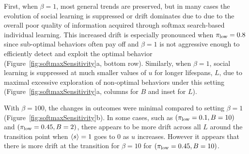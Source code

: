 \documentclass[letterpaper,11.5pt]{scrartcl}
\begin{document}
First, when $\beta=1$, most general trends are preserved, but in many cases the evolution
of social learning is suppressed or drift dominates due to 
due to the overall poor quality of information acquired through softmax search-based
individual learning. This increased drift is especially pronounced 
when $\pi_{\mathrm{low}}=0.8$ since sub-optimal behaviors often pay off and $\beta=1$ is
not aggressive enough to efficiently detect and exploit the optimal 
behavior (Figure~\ref{fig:softmaxSensitivity}a, bottom row).
Similarly, when $\beta = 1$, social learning is suppressed at much smaller values
of $u$ for longer lifespans, $L$, due to maximal excessive exploration of non-optimal
behaviors under this setting (Figure~\ref{fig:softmaxSensitivity}a, columns 
for $B$ and inset for $L$).

With $\beta=100$, the changes in outcomes were minimal compared
to setting $\beta=1$ (Figure~\ref{fig:softmaxSensitivity}b). 
In some cases, such as $(\pi_{\mathrm{low}}=0.1, B=10)$ 
and $(\pi_{\mathrm{low}}=0.45, B=2)$,
there appears to be more drift across all $L$ around the transition
point when $\langle s \rangle = 1$ goes to 0 as $u$ increases. However it appears
that there is more drift at the transition for $\beta=10$ for
$(\pi_{\mathrm{low}}=0.45, B=10)$. 
\end{document}

